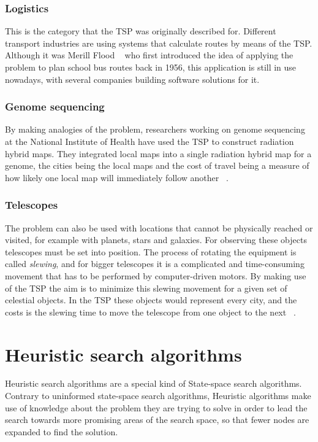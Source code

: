 \documentclass[runningheads]{llncs}
\begin{document}
\subsubsection{Logistics}
This is the category that the TSP was originally described for. Different transport industries are using systems that calculate routes by means of the TSP. Although it was Merill Flood ~\cite{ref_book_flood} who first introduced the idea of applying the problem to plan school bus routes back in 1956, this application is still in use nowadays, with several companies building software solutions for it.

\subsubsection{Genome sequencing}
By making analogies of the problem, researchers working on genome sequencing at the National Institute of Health have used the TSP to construct radiation hybrid maps. They integrated local maps into a single radiation hybrid map for a genome, the cities being the local maps and the cost of travel being a measure of how likely one local map will immediately follow another ~\cite{ref_article_genome}.

\subsubsection{Telescopes}
The problem can also be used with locations that cannot be physically reached or visited, for example with planets, stars and galaxies.
For observing these objects telescopes must be set into position. The process of rotating the equipment is called {\itshape slewing}, and 
for bigger telescopes it is a complicated and time-consuming movement that has to be performed by computer-driven motors.
By making use of the TSP the aim is to minimize this slewing movement for a given set of celestial objects. In the TSP these objects 
would represent every city, and the costs is the slewing time to move the telescope from one object to the next ~\cite{ref_book_tsp}.


%
%
%
\section{Heuristic search algorithms}
Heuristic search algorithms are a special kind of State-space search algorithms. Contrary to uninformed state-space search
algorithms, Heuristic algorithms make use of knowledge about the problem they are trying to solve in order to lead the search
towards more promising areas of the search space, so that fewer nodes are expanded to find the solution.
\end{document}

